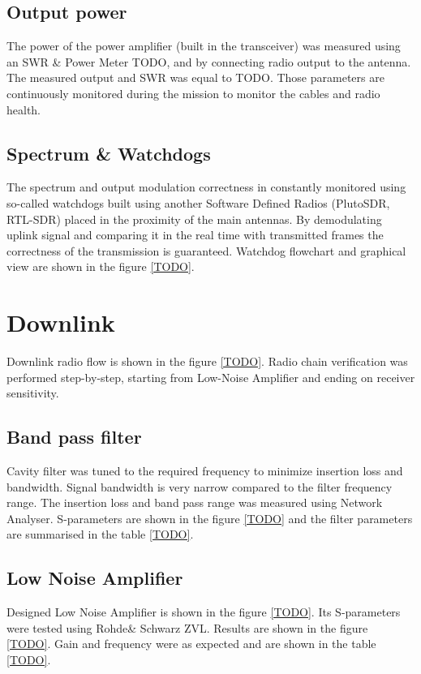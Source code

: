 \subsection{Output power}
The power of the power amplifier (built in the transceiver) was measured using an SWR \& Power Meter TODO, and by connecting radio output to the antenna. The measured output and SWR was equal to TODO. Those parameters are continuously monitored during the mission to monitor the cables and radio health.

\subsection{Spectrum \& Watchdogs}
The spectrum and output modulation correctness in constantly monitored using so-called watchdogs built using another Software Defined Radios (PlutoSDR, RTL-SDR) placed in the proximity of the main antennas.
By demodulating uplink signal and comparing it in the real time with transmitted frames the correctness of the transmission is guaranteed. Watchdog flowchart and graphical view are shown in the figure \ref{TODO}.



\section{Downlink}
Downlink radio flow is shown in the figure \ref{TODO}. Radio chain verification was performed step-by-step, starting from Low-Noise Amplifier and ending on receiver sensitivity.

\subsection{Band pass filter}
Cavity filter was tuned to the required frequency to minimize insertion loss and bandwidth. Signal bandwidth is very narrow compared to the filter frequency range.
The insertion loss and band pass range was measured using Network Analyser. S-parameters are shown in the figure \ref{TODO} and the filter parameters are summarised in the table \ref{TODO}.


\subsection{Low Noise Amplifier}
Designed Low Noise Amplifier is shown in the figure \ref{TODO}. Its S-parameters were tested using Rohde\& Schwarz ZVL. Results are shown in the figure \ref{TODO}. Gain and frequency were as expected and are shown in the table \ref{TODO}.



